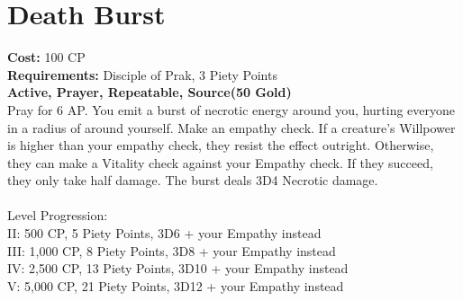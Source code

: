 \section{Death Burst}\label{prayer:deathBurst}
\textbf{Cost:} 100 CP\\
\textbf{Requirements:} Disciple of Prak, 3 Piety Points \\
\textbf{Active, Prayer, Repeatable, Source(50 Gold)}\\
Pray for 6 AP.
You emit a burst of necrotic energy around you, hurting everyone in a radius of  around yourself.
Make an empathy check.
If a creature's Willpower is higher than your empathy check, they resist the effect outright.
Otherwise, they can make a Vitality check against your Empathy check.
If they succeed, they only take half damage.
The burst deals 3D4 Necrotic damage.\\
\\
Level Progression:\\
II: 500 CP, 5 Piety Points, 3D6 + your Empathy instead\\
III: 1,000 CP, 8 Piety Points, 3D8 + your Empathy instead\\
IV: 2,500 CP, 13 Piety Points, 3D10 + your Empathy instead\\
V: 5,000 CP, 21 Piety Points, 3D12 + your Empathy instead\\